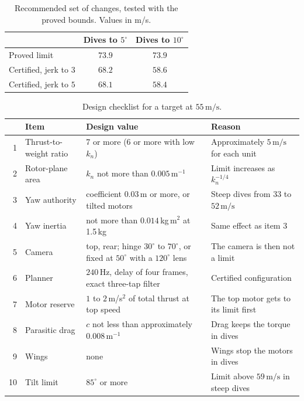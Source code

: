 \documentclass[11pt]{article}
\newcommand{\ms}{\,\mathrm{m/s}}
\begin{document}
\begin{table}[h]
\centering
\caption{Recommended set of changes, tested with the proved bounds. Values in m/s.}
\label{tab:package}
\begin{tabular}{@{}lcc@{}}
\toprule
 & Dives to $5^\circ$ & Dives to $10^\circ$ \\
\midrule
Proved limit & $73.9$ & $73.9$ \\
Certified, jerk to $3$ & $68.2$ & $58.6$ \\
Certified, jerk to $5$ & $68.1$ & $58.4$ \\
\bottomrule
\end{tabular}
\end{table}

\begin{table}[h]
\centering
\caption{Design checklist for a target at $55\ms$.}
\label{tab:checklist}
\small
\begin{tabularx}{\linewidth}{@{}rlYY@{}}
\toprule
 & Item & Design value & Reason \\
 & Thrust-to-weight ratio & 7 or more (6 or more with low $k_n$) & Approximately $5\ms$ for each unit \\
2 & Rotor-plane area & $k_n$ not more than $0.005\,\mathrm{m}^{-1}$ & Limit increases as $k_n^{-1/4}$ \\
3 & Yaw authority & coefficient $0.03$\,m or more, or tilted motors & Steep dives from $33$ to $52\ms$ \\
4 & Yaw inertia & not more than $0.014$\,kg\,m$^2$ at 1.5\,kg & Same effect as item 3 \\
5 & Camera & top, rear; hinge $30^\circ$ to $70^\circ$, or fixed at $50^\circ$ with a $120^\circ$ lens & The camera is then not a limit \\
6 & Planner & $240$\,Hz, delay of four frames, exact three-tap filter & Certified configuration \\
7 & Motor reserve & $1$ to $2$\,m/s$^2$ of total thrust at top speed & The top motor gets to its limit first \\
8 & Parasitic drag & $c$ not less than approximately $0.008\,\mathrm{m}^{-1}$ & Drag keeps the torque in dives \\
9 & Wings & none & Wings stop the motors in dives \\
10 & Tilt limit & $85^\circ$ or more & Limit above $59\ms$ in steep dives \\
\bottomrule
\end{tabularx}
\end{table}
\end{document}
